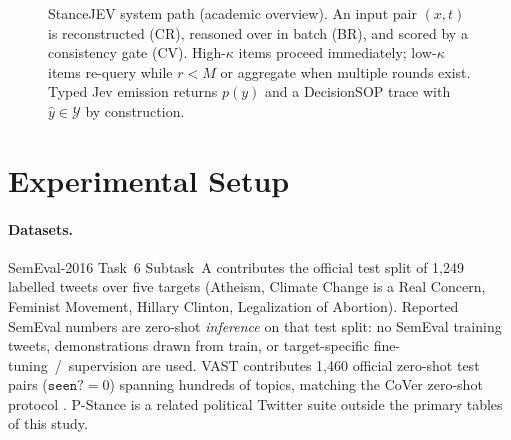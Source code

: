 \documentclass[10pt]{article}
\theoremstyle{definition}
\begin{document}
\begin{figure}[t]
{}
\caption{StanceJEV system path (academic overview).
An input pair $(x,t)$ is reconstructed (CR), reasoned over in batch (BR), and scored by a consistency gate
(CV).
High-$\kappa$ items proceed immediately; low-$\kappa$ items re-query while $r{<}M$ or aggregate when multiple
rounds exist.
Typed Jev emission returns $p(y)$ and a DecisionSOP trace with $\hat{y}\in\mathcal{Y}$ by construction.}
\label{fig:pipeline}
\end{figure}

\section{Experimental Setup}
\label{sec:setup}

\paragraph{Datasets.}
SemEval-2016 Task~6 Subtask~A \cite{mohammad2016semeval} contributes the official test split of 1{,}249
labelled tweets over five targets (Atheism, Climate Change is a Real Concern, Feminist Movement, Hillary
Clinton, Legalization of Abortion).
Reported SemEval numbers are zero-shot \emph{inference} on that test split: no SemEval training tweets,
demonstrations drawn from train, or target-specific fine-tuning~/~supervision are used.
VAST \cite{allaway2020vast} contributes 1{,}460 official zero-shot test pairs ($\texttt{seen?}{=}0$) spanning
hundreds of topics, matching the CoVer zero-shot protocol \cite{yan2025cover}.
P-Stance \cite{li2021pstance} is a related political Twitter suite outside the primary tables of this study.
\end{document}
